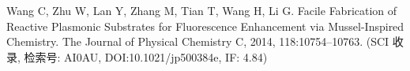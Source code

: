 \begin{resume}
\begin{enumerate}[{[}1{]}]
  \item Wang C, Zhu W, Lan Y, Zhang M, Tian T, Wang H, Li G. Facile Fabrication of Reactive Plasmonic Substrates for Fluorescence Enhancement via Mussel-Inspired Chemistry.  The Journal of Physical Chemistry C, 2014, 118:10754–10763. (SCI 收录, 检索号: AI0AU, DOI:10.1021/jp500384e, IF: 4.84)
  \end{enumerate}

\end{resume}
